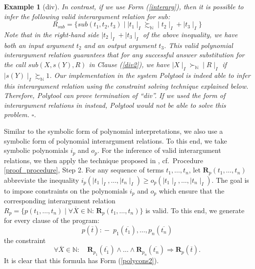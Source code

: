 \documentclass[envcountsame]{tlp}
\newcommand{\incase}{:\!\!-\;}
\newcounter{polycons2ctr}
\newcounter{polycons1ctr}
\newcounter{ex:der-lastsymconsctr}
\newtheorem{example}{Example}
\begin{document}
\begin{example}[div]
In contrast, if we use Form (\ref{interarg}), then it
is possible to infer the following valid interargument relation for $\mathit{sub}$: 
\[ R_{\mathit{sub}} = \{ \mathit{sub}(t_1,t_2,t_3) \mid
{\mid}t_1{\mid}_I \succsim_\mathbb{N}
{\mid}t_2{\mid}_I + {\mid}t_3{\mid}_I \}\] 
Note that in the right-hand side  ${\mid}t_2{\mid}_I + {\mid}t_3{\mid}_I$ of the 
above inequality, we have both an input argument $t_2$ and an output
argument $t_3$.
This valid polynomial interargument relation guarantees that for any
successful answer substitution for
the call $\mathit{sub}(X,s(Y),R)$ in Clause (\ref{div2}), we have
${\mid}X{\mid}_I \succ_\mathbb{N} {\mid}R{\mid}_I$ if
${\mid}s(Y){\mid}_I \succsim_\mathbb{N} 1$.
Our implementation in the system
\textsf{Polytool} is indeed able to infer this
interargument relation using the constraint solving technique explained below.
Therefore, \textsf{Polytool} can
prove termination of
``\textit{div}''. 
If
we used the form of interargument relations in \cite{Decorteetal98} instead,
\textsf{Polytool} would not be able to solve this problem.
\hfill{$\square$}.
\end{example}




Similar to the symbolic form of polynomial interpretations, we also use
a symbolic form of polynomial interargument relations. To this end,
we take
symbolic  polynomials $i_p$ and
$o_p$. For the inference of valid interargument relations, we then apply the technique
proposed in \cite{Decorteetal98}, cf.\ Procedure \ref{proof_procedure}, Step 2.
For any sequence of terms $t_1,\ldots, t_n$, let $\mathbf{R}_{p}(t_1,\ldots, t_n)$ abbreviate
the inequality  $i_p({\mid}t_1{\mid}_I,\ldots,
{\mid}t_n{\mid}_I)  \geq o_p({\mid}t_1{\mid}_I,\ldots,
{\mid}t_n{\mid}_I)$. 
The goal is to impose constraints on the polynomials $i_p$ and $o_p$ which
ensure that the corresponding interargument relation
$R_p = \{ p(t_1,\ldots,t_n) \mid   \forall \overline{X} \in \mathbb{N}: \,
\mathbf{R}_{p}(t_1,\ldots, t_n) \}$
is valid. To this end,
we generate for every clause of the program:
\[p(\overline{t}) \incase p_1(\overline{t_1}), \ldots,
p_n(\overline{t_n})\]
the constraint 
\[   \forall \overline{X} \in \mathbb{N}: \quad 
\mathbf{R}_{p_1}(\overline{t_1}) \wedge \ldots \wedge
\mathbf{R}_{p_n}(\overline{t_n}) \Rightarrow \mathbf{R}_{p}(\overline{t}). \]
It is clear that
this formula has Form (\ref{polycons2}).
\end{document}
